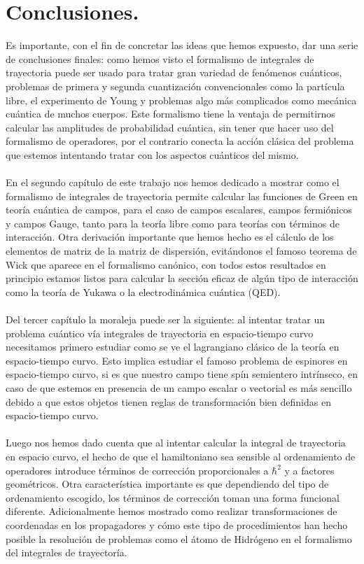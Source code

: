 \chapter{Conclusiones.}
Es importante, con el fin de concretar las ideas que hemos expuesto, dar una serie de conclusiones finales: como hemos visto el formalismo de integrales de trayectoria puede ser usado para tratar gran variedad de fenómenos cuánticos, problemas de primera y segunda cuantización convencionales como la partícula libre, el experimento de Young y problemas algo más complicados como mecánica cuántica de muchos cuerpos. Este formalismo tiene la ventaja de permitirnos calcular las amplitudes de probabilidad cuántica, sin tener que hacer uso del formalismo de operadores, por el contrario conecta la acción clásica del problema que estemos intentando tratar con los aspectos cuánticos del mismo.
\\
\\
En el segundo capítulo de este trabajo nos hemos dedicado a mostrar como el formalismo de integrales de trayectoria permite calcular las funciones de Green en teoría cuántica de campos, para el caso de campos escalares, campos fermiónicos y campos Gauge, tanto para la teoría libre como para teorías con términos de interacción. Otra derivación importante que hemos hecho es el cálculo de los elementos de matriz de la matriz de dispersión, evitándonos el famoso teorema de Wick que aparece en el formalismo canónico, con todos estos resultados en principio estamos listos para calcular la sección eficaz de algún tipo de interacción como la teoría de Yukawa o la electrodinámica cuántica (QED).
\\
\\
Del tercer capítulo la moraleja puede ser la siguiente: al intentar tratar un problema cuántico vía integrales de trayectoria en espacio-tiempo curvo necesitamos primero estudiar como se ve el lagrangiano clásico de la teoría en espacio-tiempo curvo. Esto implica estudiar el famoso problema de espinores en espacio-tiempo curvo, si es que nuestro campo tiene spín semientero intrínseco, en caso de que estemos en presencia de un campo escalar o vectorial es más sencillo debido a que estos objetos tienen reglas de transformación bien definidas en espacio-tiempo curvo.
\\
\\
Luego nos hemos dado cuenta que al intentar calcular la integral de trayectoria en espacio curvo, el hecho de que el hamiltoniano sea sensible al ordenamiento de operadores introduce términos de corrección proporcionales a $\hbar^2$ y a factores geométricos. Otra característica importante es que dependiendo del tipo de ordenamiento escogido, los términos de corrección toman una forma funcional diferente. Adicionalmente hemos mostrado como realizar transformaciones de coordenadas en los propagadores y cómo este tipo de procedimientos han hecho posible la resolución de problemas como el átomo de Hidrógeno en el formalismo del integrales de trayectoría.
